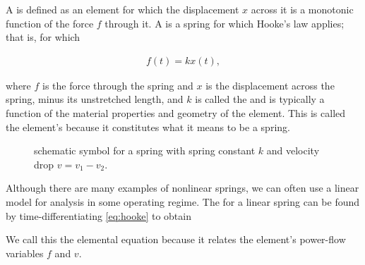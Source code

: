 \documentclass[dynamic_systems.tex]{subfiles}
\begin{document}
A  is defined as an element for which the displacement $x$ across it is a monotonic function of the force $f$ through it.
A  is a spring for which Hooke's law applies; that is, for which

\begin{align}
\label{eq:hooke}
	f(t) = k x(t),
\end{align}

where $f$ is the force through the spring and $x$ is the displacement across the spring, minus its unstretched length, and $k$ is called the  and is typically a function of the material properties and geometry of the element.
This is called the element's  because it constitutes what it means to be a spring.


\begin{wrapfigure}[8]{r}{0.3\textwidth}
  \centering
  \caption{\label{fig:spring} schematic symbol for a spring with spring constant $k$ and velocity drop $v = v_1 - v_2$.}%
\end{wrapfigure}

Although there are many examples of nonlinear springs, we can often use a linear model for analysis in some operating regime.
The  for a linear spring can be found by time-differentiating \autoref{eq:hooke} to obtain
\tags{}


We call this the elemental equation because it relates the element's power-flow variables $f$ and $v$.
\end{document}
